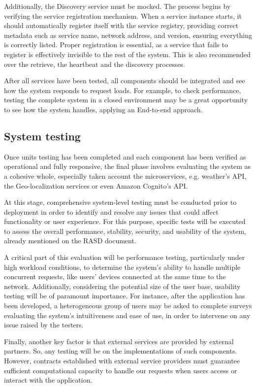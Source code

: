 Additionally, the Discovery service must be mocked. The process begins by verifying the service registration mechanism. When a service instance starts, it should automatically register itself with the service registry, providing correct metadata such as service name, network address, and version, ensuring everything is correctly listed. Proper registration is essential, as a service that fails to register is effectively invisible to the rest of the system. This is also recommended over the retrieve, the heartbeat and the discovery processes.

After all services have been tested, all components should be integrated and see how the system responds to request loads. For example, to check performance, testing the complete system in a closed environment may be a great opportunity to see how the system handles, applying an End-to-end approach.

\subsection{System testing}
Once units testing has been completed and each component has been verified as operational and fully responsive, the final phase involves evaluating the system as a cohesive whole, especially taken account the microservices, e.g. weather's API, the Geo-localization services or even Amazon Cognito's API. 

At this stage, comprehensive system-level testing must be conducted prior to deployment in order to identify and resolve any issues that could affect functionality or user experience. For this purpose, specific tests will be executed to assess the overall performance, stability, security, and usability of the system, already mentioned on the RASD document.

A critical part of this evaluation will be performance testing, particularly under high workload conditions, to determine the system’s ability to handle multiple concurrent requests, like users' devices connected at the same time to the network. Additionally, considering the potential size of the user base, usability testing will be of paramount importance. For instance, after the application has been developed, a heterogeneous group of users may be asked to complete surveys evaluating the system’s intuitiveness and ease of use, in order to intervene on any issue raised by the testers. 

Finally, another key factor is that external services are provided by external partners. So, any testing will be on the implementations of such components. However, contracts established with external service providers must guarantee sufficient computational capacity to handle our requests when users access or interact with the application.

